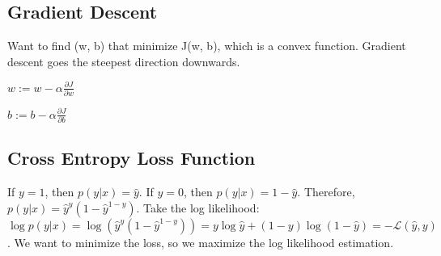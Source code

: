 \subsection{Gradient Descent} 

Want to find (w, b) that minimize J(w, b), which is a convex function. Gradient descent goes the steepest direction downwards.

$w := w - \alpha \frac{\partial J}{\partial w}$ 

$b := b - \alpha \frac{\partial J}{\partial b}$

\subsection{Cross Entropy Loss Function}
If $y=1$, then $p(y|x) = \hat{y}$. If $y = 0$, then $p(y|x) = 1 - \hat{y}$. Therefore, $p(y|x) = \hat{y}^y (1-\hat{y}^{1-y})$. Take the log likelihood: $\log p(y|x) = \log (\hat{y}^y (1-\hat{y}^{1-y})) = y \log \hat{y} + (1-y) \log (1 - \hat{y}) = - \mathcal{L}(\hat{y}, y)$. We want to minimize the loss, so we maximize the log likelihood estimation.